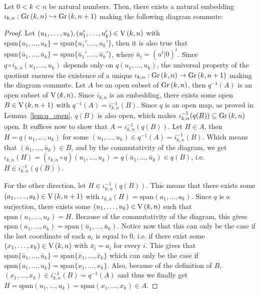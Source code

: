 \begin{proposition}\label{prop:gr_embedding} Let $0<k<n$ be natural numbers. Then, there exists a natural embedding $\iota_{k,n}:\Gr{k}{n}\hookrightarrow\Gr{k}{n+1}$ making the following diagram commute:
\begin{center}
\end{center}
\end{proposition}
\begin{proof} Let $(u_1,\ldots,u_k),(u_1',\ldots,u_k')\in\St{k}{n}$ with $\mathrm{span}\{u_1,\ldots,u_k\}=\mathrm{span}\{u_1',\ldots,u_k'\}$, then it is also true that $\mathrm{span}\{\bar{u}_1,\ldots,\bar{u}_k\}=\mathrm{span}\{\bar{u}_1',\ldots,\bar{u}_k'\}$, where $\bar{u}_i=(u^t|0)^t$. Since $q\circ i_{k,n}(u_1,\ldots,u_k)$ depends only on $q(u_1,\ldots,u_k)$, the universal property of the quotient ensures the existence of a unique $\iota_{k,n}:\Gr{k}{n}\to\Gr{k}{n+1}$ making the diagram commute. Let $A$ be an open subset of $\Gr{k}{n}$, then $q^{-1}(A)$ is an open subset of $\St{k}{n}$. Since $i_{k,n}$ is an embedding, there exists some open $B\in\St{k}{n+1}$ with $q^{-1}(A)=i_{k,n}^{-1}(B)$. Since $q$ is an open map, as proved in Lemma~\ref{lem:q_open}, $q(B)$ is also open, which makes $\iota_{k,n}^{-1}(q(B))\subseteq\Gr{k}{n}$ open. It suffices now to show that $A=\iota_{k,n}^{-1}(q(B))$. Let $H\in A$, then $H=q(u_1,\ldots,u_k)$ for some $(u_1,\ldots,u_k)\in q^{-1}(A)=i_{k,n}^{-1}(B)$. Which means that $(\bar{u}_1,\ldots,\bar{u}_k)\in B$, and by the commutativity of the diagram, we get $\iota_{k,n}(H)=(\iota_{k,n}\circ q)(u_1,\ldots,u_k)=q(\bar{u}_1,\ldots,\bar{u}_k)\in q(B)$, i.e. $H\in\iota_{k,n}^{-1}(q(B))$.

For the other direction, let $H\in\iota_{k,n}^{-1}(q(B))$. This means that there exists some $(a_1,\ldots,a_k)\in\St{k}{n+1}$ with $\iota_{k,n}(H)=\mathrm{span}(a_1,\ldots,a_k)$. Since $q$ is a surjection, there exists some $(u_1,\ldots,u_k)\in\St{k}{n}$ such that $\mathrm{span}(u_1,\ldots,u_k)=H$. Because of the commutativity of the diagram, this gives $\mathrm{span}(a_1,\ldots,a_k)=\mathrm{span}(\bar{u}_1,\ldots,\bar{u}_k)$. Notice now that this can only be the case if the last coordinate of each $a_i$ is equal to $0$, i.e. if there exist some $(x_1,\ldots,x_k)\in\St{k}{n}$ with $\bar{x}_i=a_i$ for every $i$. This gives that $\mathrm{span}\{\bar{u}_1,\ldots,\bar{u}_k\}=\mathrm{span}\{\bar{x}_1,\ldots,\bar{x}_k\}$ which can only be the case if $\mathrm{span}\{u_1,\ldots,u_k\}=\mathrm{span}\{x_1,\ldots,x_k\}$. Also, because of the definition of $B$, $(x_1,\ldots,x_k)\in i_{k,n}^{-1}(B)=q^{-1}(A)$ and thus we finally get $H=\mathrm{span}(u_1,\ldots,u_k)=\mathrm{span}(x_1,\ldots,x_k)\in A$.
\end{proof}

